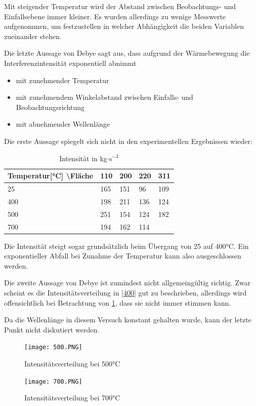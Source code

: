 \documentclass[
	a4paper,
	12pt,
	pagesize,
	ngerman
]{scrartcl}
\begin{document}
Mit steigender Temperatur wird der Abstand zwischen Beobachtungs- und Einfallsebene immer kleiner. Es wurden allerdings zu wenige Messwerte aufgenommen, um festzustellen in welcher Abhängigkeit die beiden Variablen zueinander stehen.

Die letzte Aussage von Debye sagt aus, dass aufgrund der Wärmebewegung die Interferenzintensität exponentiell abnimmt
\begin{itemize}
\item mit zunehmender Temperatur 
\item mit zunehmendem Winkelabstand zwischen Einfalls- und Beobachtungsrichtung 
\item mit abnehmender Wellenlänge
\end{itemize}

Die erste Aussage spiegelt sich nicht in den experimentellen Ergebnissen wieder:
\begin{table}[h]
\caption{Intensität in kg$\cdot \text{s}^{-3}$}
\begin{tabular}{l|llll}
Temperatur[°C] \textbackslash{}Fläche & 110 & 200 & 220 & 311 \\ \hline
25                               & 165 & 151 & 96  & 109 \\
400                              & 198 & 211 & 136 & 124 \\
500                              & 251 & 154 & 124 & 182 \\
700                              & 194 & 162 & 114 &    
\end{tabular}
\end{table}

Die Intensität steigt sogar grundsätzlich beim Übergang von 25 auf 400°C. Ein exponentieller Abfall bei Zunahme der Temperatur kann also ausgeschlossen werden.

Die zweite Aussage von Debye ist zumindest nicht allgemeingültig richtig. Zwar scheint es die Intensitätsverteilung in \cref{400} gut zu beschrieben, allerdings wird offensichtlich bei Betrachtung von \cref{500}, dass sie nicht immer stimmen kann. 

Da die Wellenlänge in diesem Versuch konstant gehalten wurde, kann der letzte Punkt nicht diskutiert werden.

\begin{figure}[h]
	\centering
	\texttt{[image: 500.PNG]}
	\caption{Intensitätsverteilung bei 500°C}
	\label{500}
\end{figure}

\begin{figure}[h]
	\centering
	\texttt{[image: 700.PNG]}
	\caption{Intensitätsverteilung bei 700°C}
	\label{700}
\end{figure}
\end{document}
